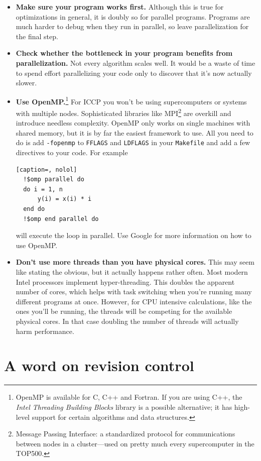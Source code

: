 \documentclass[openany,oneside]{report}
\begin{document}
\begin{itemize}
  \item\textbf{Make sure your program works first.} Although this is true for optimizations in general, it is doubly so for parallel programs.
    Programs are much harder to debug when they run in parallel, so leave parallelization for the final step.
  \item\textbf{Check whether the bottleneck in your program benefits from parallelization.} Not every algorithm scales well.
    It would be a waste of time to spend effort parallelizing your code only to discover that it's now actually slower.
  \item\textbf{Use OpenMP.}\footnote{OpenMP is available for C, C++ and Fortran.
    If you are using C++, the \emph{Intel Threading Building Blocks} library is a possible alternative; it has high-level support for certain algorithms and data structures.} For ICCP you won't be using supercomputers or systems with multiple nodes.
    Sophisticated libraries like MPI\footnote{Message Passing Interface: a standardized protocol for communications between nodes in a cluster---used on pretty much every supercomputer in the TOP500.} are overkill and introduce needless complexity.
    OpenMP only works on single machines with shared memory, but it is by far the easiest framework to use.
    All you need to do is add \texttt{-fopenmp} to \texttt{FFLAGS} and \texttt{LDFLAGS} in your \texttt{Makefile} and add a few directives to your code.
    For example
\begin{lstlisting}[caption=, nolol]
  !$omp parallel do
  do i = 1, n
      y(i) = x(i) * i
  end do
  !$omp end parallel do
\end{lstlisting}
    will execute the loop in parallel. Use Google for more information on how to use OpenMP.
  \item\textbf{Don't use more threads than you have physical cores.} This may seem like stating the obvious, but it actually happens rather often.
  Most modern Intel processors implement hyper-threading.
  This doubles the apparent number of cores, which helps with task switching when you're running many different programs at once.
  However, for CPU intensive calculations, like the ones you'll be running, the threads will be competing for the available physical cores.
  In that case doubling the number of threads will actually harm performance.
\end{itemize}

\chapter[Revision control]{A word on revision control}
\label{chap:Revision control}
\end{document}
